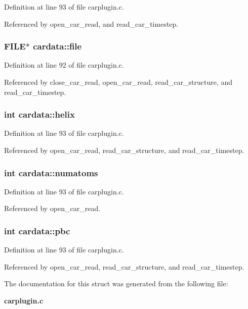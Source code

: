 Definition at line 93 of file carplugin.c.

Referenced by open\_\-car\_\-read, and read\_\-car\_\-timestep.
\subsubsection{\setlength{\rightskip}{0pt plus 5cm}FILE$\ast$ cardata::file}\label{structcardata_m0}




Definition at line 92 of file carplugin.c.

Referenced by close\_\-car\_\-read, open\_\-car\_\-read, read\_\-car\_\-structure, and read\_\-car\_\-timestep.
\subsubsection{\setlength{\rightskip}{0pt plus 5cm}int cardata::helix}\label{structcardata_m3}




Definition at line 93 of file carplugin.c.

Referenced by open\_\-car\_\-read, read\_\-car\_\-structure, and read\_\-car\_\-timestep.
\subsubsection{\setlength{\rightskip}{0pt plus 5cm}int cardata::numatoms}\label{structcardata_m1}




Definition at line 93 of file carplugin.c.

Referenced by open\_\-car\_\-read.
\subsubsection{\setlength{\rightskip}{0pt plus 5cm}int cardata::pbc}\label{structcardata_m2}




Definition at line 93 of file carplugin.c.

Referenced by open\_\-car\_\-read, read\_\-car\_\-structure, and read\_\-car\_\-timestep.

The documentation for this struct was generated from the following file:\begin{CompactItemize}
\item 
{\bf carplugin.c}\end{CompactItemize}
